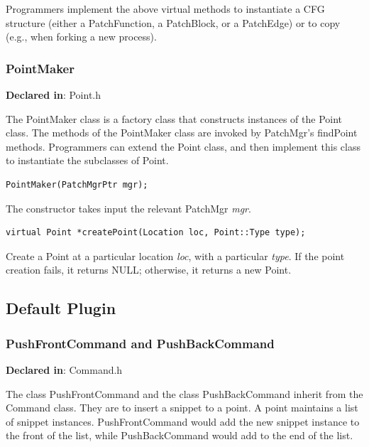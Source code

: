 \documentclass[11pt]{article}
\begin{document}
Programmers implement the above virtual methods to instantiate a CFG structure
(either a PatchFunction, a PatchBlock, or a PatchEdge) or to copy (e.g., when
forking a new process).

\subsubsection{PointMaker}
\label{sec-3.2.13}

\textbf{Declared in}: Point.h

The PointMaker class is a factory class that constructs instances of the Point
class. The methods of the PointMaker class are invoked by PatchMgr's findPoint
methods. Programmers can extend the Point class, and then implement this class
to instantiate the subclasses of Point.


\begin{verbatim}
PointMaker(PatchMgrPtr mgr);

\end{verbatim}



The constructor takes input the relevant PatchMgr \emph{mgr}.


\begin{verbatim}
virtual Point *createPoint(Location loc, Point::Type type);

\end{verbatim}



Create a Point at a particular location \emph{loc}, with a particular \emph{type}. If the
point creation fails, it returns NULL; otherwise, it returns a new Point.

\subsection{Default Plugin}
\label{sec-3.3}

\subsubsection{PushFrontCommand and PushBackCommand}
\label{sec-3.3.1}

\textbf{Declared in}: Command.h

The class PushFrontCommand and the class PushBackCommand inherit from the
Command class. They are to insert a snippet to a point. A point maintains a
list of snippet instances. PushFrontCommand would add the new snippet instance
to the front of the list, while PushBackCommand would add to the end of the
list.
\end{document}
